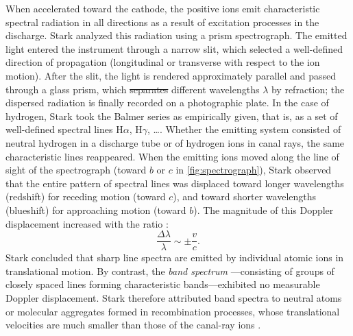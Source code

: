 \documentclass[pdflatex]{sn-jnl} %
\providecommand{\DIFadd}[1]{{\protect\color{blue}\uwave{#1}}} %
\providecommand{\DIFdel}[1]{{\protect\color{red}\sout{#1}}}                      %
\providecommand{\DIFaddbegin}{} %
\providecommand{\DIFaddend}{} %
\providecommand{\DIFdelbegin}{} %
\providecommand{\DIFdelend}{} %
\begin{document}
When accelerated toward the cathode, the positive ions emit characteristic spectral radiation in all directions as a result of excitation processes in the discharge. Stark analyzed this radiation using a prism spectrograph. The emitted light entered the instrument through a narrow slit, which selected a well-defined direction of propagation (longitudinal or transverse with respect to the ion motion). After \DIFaddbegin \DIFadd{passing through }\DIFaddend the slit, the light is rendered approximately parallel and passed through a glass prism, which \DIFdelbegin \DIFdel{separates }\DIFdelend \DIFaddbegin \DIFadd{separated }\DIFaddend different wavelengths $\lambda$ by refraction; the dispersed radiation is finally recorded on a photographic plate. In the case of hydrogen, Stark took the Balmer series as empirically given, that is, as a set of well-defined spectral lines $\mathrm{H}\alpha$, $\mathrm{H}\gamma$, \dots \citep[417]{Stark1906}. Whether the emitting system consisted of neutral hydrogen in a discharge tube or of hydrogen ions in canal rays, the same characteristic lines reappeared. When the emitting ions moved along the line of sight of the spectrograph (toward $b$ or $c$ in \cref{fig:spectrograph}), Stark observed that the entire pattern of spectral lines was displaced toward longer wavelengths (redshift) for receding motion (toward $c$), and toward shorter wavelengths (blueshift) for approaching motion (toward $b$). The magnitude of this Doppler displacement increased with the ratio \betafactorh:
%
\begin{equation*}
\frac{\Delta\lambda}{\lambda} \sim \pm \frac{v}{c}.
\end{equation*}
%
Stark concluded that sharp line spectra  are emitted by individual atomic ions in translational motion. By contrast, the \emph{band spectrum} ---consisting of groups of closely spaced lines forming characteristic bands---exhibited no measurable Doppler displacement. Stark therefore attributed band spectra to neutral atoms or molecular aggregates formed in recombination processes, whose translational velocities are much smaller than those of the canal-ray ions \citep[426]{Stark1906}.
\end{document}
